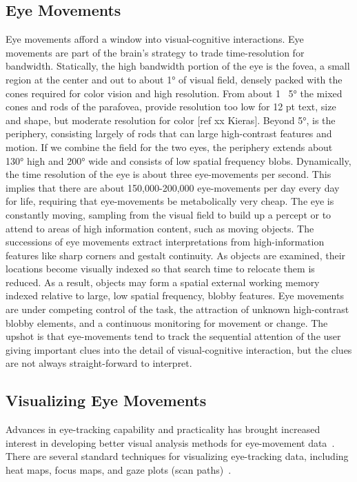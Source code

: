 \documentclass{sigchi}
\begin{document}
\subsection{Eye Movements} Eye movements afford a window into
visual-cognitive interactions. Eye movements are part of the brain’s
strategy to trade time-resolution for bandwidth. Statically, the high
bandwidth portion of the eye is the fovea, a small region at the center and
out to about 1° of visual field, densely packed with the cones required for
color vision and high resolution. From about 1~ 5° the mixed cones and rods
of the parafovea, provide resolution too low for 12 pt text, size and
shape, but moderate resolution for color [ref xx Kieras].  Beyond 5°, is
the periphery, consisting largely of rods that can large high-contrast
features and motion. If we combine the field for the two eyes, the
periphery extends about 130° high and 200° wide and consists of low spatial
frequency blobs. Dynamically, the time resolution of the eye is about three
eye-movements per second. This implies that there are about 150,000-200,000
eye-movements per day every day for life, requiring that eye-movements be
metabolically very cheap.  The eye is constantly moving, sampling from the
visual field to build up a percept or to attend to areas of high
information content, such as moving objects. The successions of eye
movements extract interpretations from high-information features like sharp
corners and gestalt continuity. As objects are examined, their locations
become visually indexed so that search time to relocate them is reduced. As
a result, objects may form a spatial external working memory indexed
relative to large, low spatial frequency, blobby features. Eye movements
are under competing control of the task, the attraction of unknown
high-contrast blobby elements, and a continuous monitoring for movement or
change. The upshot is that eye-movements tend to track the sequential
attention of the user giving important clues into the detail of
visual-cognitive interaction, but the clues are not always straight-forward
to interpret. 


\subsection{Visualizing Eye Movements} Advances in eye-tracking capability
and practicality has brought increased interest in developing better visual
analysis methods for eye-movement data~\cite{Blascheck_2014}. There are
several standard techniques for visualizing eye-tracking data, including
heat maps, focus maps, and gaze plots (scan paths)~\cite{Holmqvist_2011}. 
\end{document}
